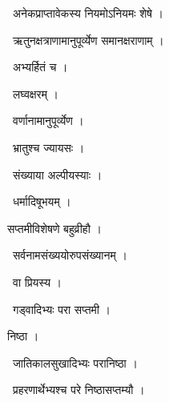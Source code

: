 \documentclass[10pt, openany, oneside]{book}
\begin{document}
\par\noindent\hspace{1.5em}{\vps वा॰}~{\qt अनेकप्राप्तावेकस्य नियमोऽनियमः शेषे ।}

\par\noindent\hspace{1.5em}{\vps वा॰}~{\qt ऋतुनक्षत्राणामानुपूर्व्येण समानक्षराणाम् ।}

\par\noindent\hspace{1.5em}{\vps वा॰}~{\qt अभ्यर्हितं च ।}

\par\noindent\hspace{1.5em}{\vps वा॰}~{\qt लघ्वक्षरम् ।}

\par\noindent\hspace{1.5em}{\vps वा॰}~{\qt वर्णानामानुपूर्व्येण ।}

\par\noindent\hspace{1.5em}{\vps वा॰}~{\qt भ्रातुश्च ज्यायसः ।}

\par\noindent\hspace{1.5em}{\vps वा॰}~{\qt संख्याया अल्पीयस्याः ।}

\par\noindent\hspace{1.5em}{\vps वा॰}~{\qt धर्मादिषूभयम् ।}

\noindent सप्तमीविशेषणे बहुव्रीहौ ।

\par\noindent\hspace{1.5em}{\vps वा॰}~{\qt सर्वनामसंख्ययोरुपसंख्यानम् ।}

\par\noindent\hspace{1.5em}{\vps वा॰}~{\qt वा प्रियस्य ।}

\par\noindent\hspace{1.5em}{\vps वा॰}~{\qt गड्वादिभ्यः परा सप्तमी ।}

\noindent निष्ठा ।

\par\noindent\hspace{1.5em}{\vps वा॰}~{\qt जातिकालसुखादिभ्यः परानिष्ठा ।}

\par\noindent\hspace{1.5em}{\vps वा॰}~{\qt प्रहरणार्थेभ्यश्च परे निष्ठासप्तम्यौ ।}
\end{document}
